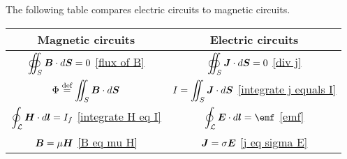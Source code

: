     The following table compares electric circuits to magnetic circuits.
    \begin{center}
        \begin{tabular}{ c|c } 
            Magnetic circuits & Electric circuits \\
            \hline
            \rule[-3ex]{0pt}{0pt}\rule{0pt}{4ex}
            $\displaystyle\oiint_S \bm{B}\cdot d\bm{S} = 0$ \eqref{flux of B} & 
            $\displaystyle\oiint_S \bm{J}\cdot d\bm{S} = 0$ \eqref{div j}\\

            \rule[-3ex]{0pt}{0pt}\rule{0pt}{4ex}
            $\displaystyle\Phi \stackrel{\text{def}}{=} \iint_S \bm{B}\cdot d\bm{S}$  & 
            $\displaystyle I = \iint_S \bm{J}\cdot d\bm{S}$ \eqref{integrate j equals I} \\

            \rule[-3ex]{0pt}{0pt}\rule{0pt}{4ex}
            $\displaystyle\oint_\mathcal{L}\bm{H}\cdot d\bm{l} = I_f$ \eqref{integrate H eq I} & 
            $\displaystyle\oint_\mathcal{L}\E\cdot d\vec{l} = \emf$ \eqref{emf} \\

            \rule[-3ex]{0pt}{0pt}\rule{0pt}{4ex}
            $\displaystyle\bm{B} = \mu\bm{H}$ \eqref{B eq mu H} & 
            $\displaystyle\bm{J} = \sigma\bm{E}$ \eqref{j eq sigma E} \\
        \end{tabular}
    \end{center}